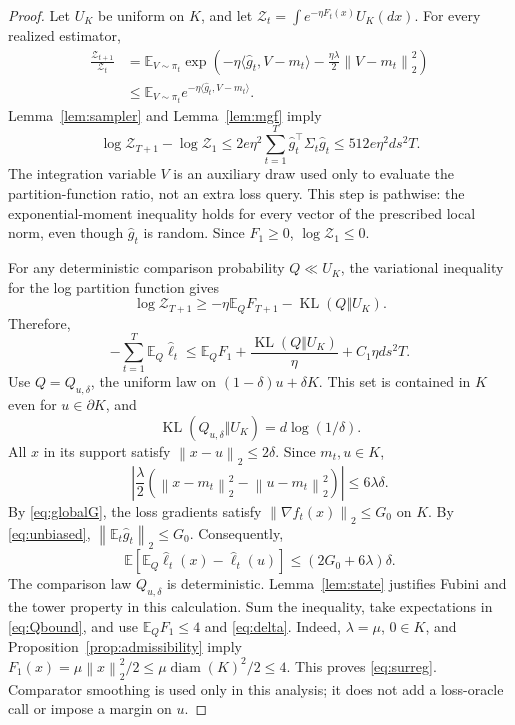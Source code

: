 \documentclass[11pt]{article}
\numberwithin{equation}{section}
\newcommand{\E}{\mathbb E}
\newcommand{\KL}{\operatorname{KL}}
\newcommand{\ip}[2]{\langle #1,#2\rangle}
\newcommand{\norm}[1]{\left\|#1\right\|}
\newcommand{\diam}{\operatorname{diam}}
\theoremstyle{definition}
\theoremstyle{remark}
\begin{document}
\begin{proof}
Let $U_K$ be uniform on $K$, and let
$\mathcal Z_t=\int e^{-\eta F_t(x)}U_K(dx)$. For every realized estimator,
\begin{align*}
 \frac{\mathcal Z_{t+1}}{\mathcal Z_t}
 &=\E_{V\sim\pi_t}
     \exp\left(-\eta\ip{\widehat g_t}{V-m_t}
                     -\frac{\eta\lambda}2\norm{V-m_t}_2^2\right)\\
 &\leq\E_{V\sim\pi_t}e^{-\eta\ip{\widehat g_t}{V-m_t}}.
\end{align*}
Lemma~\ref{lem:sampler} and Lemma~\ref{lem:mgf} imply
\[
 \log\mathcal Z_{T+1}-\log\mathcal Z_1
 \leq 2e\eta^2\sum_{t=1}^T\widehat g_t^\top\Sigma_t\widehat g_t
 \leq512e\eta^2ds^2T.
\]
The integration variable $V$ is an auxiliary draw used only to evaluate the
partition-function ratio, not an extra loss query. This step is pathwise:
the exponential-moment inequality holds for every
vector of the prescribed local norm, even though $\widehat g_t$ is random.
Since $F_1\geq0$, $\log\mathcal Z_1\leq0$.

For any deterministic comparison probability $Q\ll U_K$, the variational
inequality for the log partition function gives
\[
 \log\mathcal Z_{T+1}\geq-\eta\E_Q F_{T+1}-\KL(Q\Vert U_K).
\]
Therefore,
\begin{equation}\label{eq:Qbound}
 -\sum_{t=1}^T\E_Q\widehat\ell_t
 \leq\E_QF_1+\frac{\KL(Q\Vert U_K)}\eta+C_1\eta ds^2T.
\end{equation}
Use $Q=Q_{u,\delta}$, the uniform law on $(1-\delta)u+\delta K$. This set is
contained in $K$ even for $u\in\partial K$, and
\[
 \KL(Q_{u,\delta}\Vert U_K)=d\log(1/\delta).
\]
All $x$ in its support satisfy $\norm{x-u}_2\leq2\delta$. Since $m_t,u\in K$,
\[
 \left|\frac\lambda2
 (\norm{x-m_t}_2^2-\norm{u-m_t}_2^2)\right|\leq6\lambda\delta.
\]
By \eqref{eq:globalG}, the loss gradients satisfy
$\norm{\nabla f_t(x)}_2\leq G_0$ on $K$. By \eqref{eq:unbiased},
$\norm{\E_t\widehat g_t}_2\leq G_0$. Consequently,
\[
 \E\left[\E_Q\widehat\ell_t(x)-\widehat\ell_t(u)\right]
 \leq(2G_0+6\lambda)\delta.
\]
The comparison law $Q_{u,\delta}$ is deterministic. Lemma~\ref{lem:state}
justifies Fubini and the tower property in this calculation. Sum the inequality,
take expectations in \eqref{eq:Qbound}, and use
$\E_QF_1\leq4$ and \eqref{eq:delta}. Indeed, $\lambda=\mu$, $0\in K$,
and Proposition~\ref{prop:admissibility} imply
$F_1(x)=\mu\norm{x}_2^2/2\leq\mu\diam(K)^2/2\leq4$.
This proves
\eqref{eq:surreg}. Comparator smoothing is used only in this analysis;
it does not add a loss-oracle call or impose a margin on $u$.
\end{proof}
\end{document}
